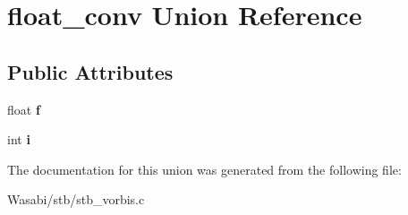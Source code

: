 \hypertarget{unionfloat__conv}{}\section{float\+\_\+conv Union Reference}
\label{unionfloat__conv}
\subsection*{Public Attributes}
\begin{DoxyCompactItemize}
\item 
float {\bfseries f}\hypertarget{unionfloat__conv_a500605cabc18ae27268bcd0af4276c16}{}\label{unionfloat__conv_a500605cabc18ae27268bcd0af4276c16}

\item 
int {\bfseries i}\hypertarget{unionfloat__conv_a9e1033bdaee2009f7d6ba9f529da0f8b}{}\label{unionfloat__conv_a9e1033bdaee2009f7d6ba9f529da0f8b}

\end{DoxyCompactItemize}


The documentation for this union was generated from the following file\+:\begin{DoxyCompactItemize}
\item 
Wasabi/stb/stb\+\_\+vorbis.\+c\end{DoxyCompactItemize}
